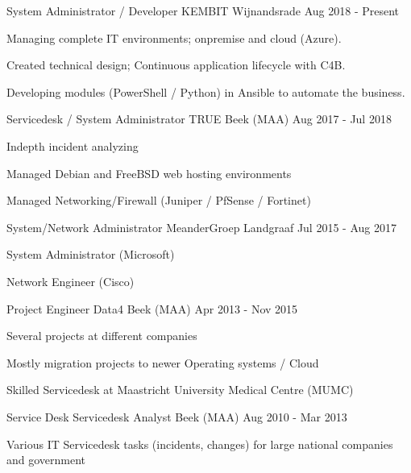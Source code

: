 \documentclass[11pt, letterpaper]{awesome-cv}
\begin{document}
\begin{cventries}


  \cventry
    {System Administrator / Developer}
    {KEMBIT}
    {Wijnandsrade}
    {Aug 2018 - Present}
    {
      \begin{cvitems}
        \item{Managing complete IT environments; onpremise and cloud (Azure).}
        \item{Created technical design; Continuous application lifecycle with C4B.}
        \item{Developing modules (PowerShell / Python) in Ansible to automate the business.}
      \end{cvitems}
    }


  \cventry
    {Servicedesk / System Administrator}
    {TRUE}
    {Beek (MAA)}
    {Aug 2017 - Jul 2018}
    {
      \begin{cvitems}
        \item{Indepth incident analyzing}
        \item{Managed Debian and FreeBSD web hosting environments}
        \item{Managed Networking/Firewall (Juniper / PfSense / Fortinet)}
      \end{cvitems}
    }


  \cventry
    {System/Network Administrator}
    {MeanderGroep}
    {Landgraaf}
    {Jul 2015 - Aug 2017}
    {
      \begin{cvitems}
        \item{System Administrator (Microsoft)}
        \item{Network Engineer (Cisco)}
      \end{cvitems}
    }


  \cventry
    {Project Engineer}
    {Data4}
    {Beek (MAA)}
    {Apr 2013 - Nov 2015}
    {
      \begin{cvitems}
        \item{Several projects at different companies}
        \item{Mostly migration projects to newer Operating systems / Cloud}
        \item{Skilled Servicedesk at Maastricht University Medical Centre (MUMC)}
      \end{cvitems}
    }


  \cventry
    {Service Desk}
    {Servicedesk Analyst}
    {Beek (MAA)}
    {Aug 2010 - Mar 2013}
    {
      \begin{cvitems}
        \item{Various IT Servicedesk tasks (incidents, changes) for large national companies and government}
      \end{cvitems}
    }



\end{cventries}
\end{document}
